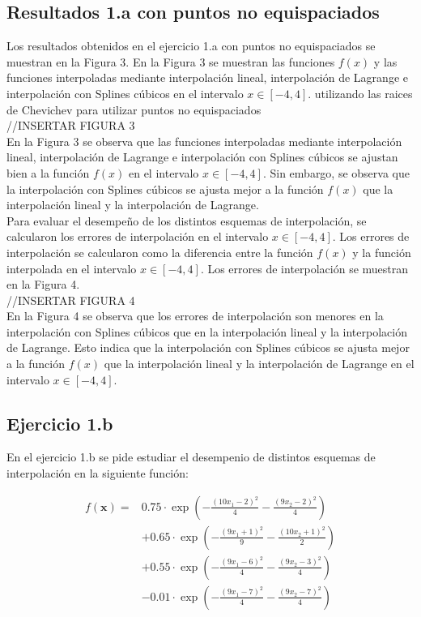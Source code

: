 \subsection{Resultados 1.a con puntos no equispaciados}
Los resultados obtenidos en el ejercicio 1.a con puntos no equispaciados se muestran en la Figura 3. En la Figura 3 se muestran las funciones $f(x)$ y las funciones interpoladas mediante interpolación lineal, interpolación de Lagrange e interpolación con Splines cúbicos en el intervalo $x \in [-4, 4]$. utilizando las raices de Chevichev para utilizar puntos no equispaciados\\
//INSERTAR FIGURA 3\\
En la Figura 3 se observa que las funciones interpoladas mediante interpolación lineal, interpolación de Lagrange e interpolación con Splines cúbicos se ajustan bien a la función $f(x)$ en el intervalo $x \in [-4, 4]$. Sin embargo, se observa que la interpolación con Splines cúbicos se ajusta mejor a la función $f(x)$ que la interpolación lineal y la interpolación de Lagrange.\\
Para evaluar el desempeño de los distintos esquemas de interpolación, se calcularon los errores de interpolación en el intervalo $x \in [-4, 4]$. Los errores de interpolación se calcularon como la diferencia entre la función $f(x)$ y la función interpolada en el intervalo $x \in [-4, 4]$. Los errores de interpolación se muestran en la Figura 4.\\
//INSERTAR FIGURA 4\\
En la Figura 4 se observa que los errores de interpolación son menores en la interpolación con Splines cúbicos que en la interpolación lineal y la interpolación de Lagrange. Esto indica que la interpolación con Splines cúbicos se ajusta mejor a la función $f(x)$ que la interpolación lineal y la interpolación de Lagrange en el intervalo $x \in [-4, 4]$.\\

\subsection{Ejercicio 1.b}
En el ejercicio 1.b se pide estudiar el desempenio de distintos esquemas de interpolación en la siguiente función:

\begin{equation}
    \begin{aligned}
    f(\textbf{x}) =&0.75 \cdot \exp\left(-\frac{(10x_1 - 2)^2}{4} - \frac{(9x_2 - 2)^2}{4}\right) \\
    & + 0.65 \cdot \exp\left(-\frac{(9x_1 + 1)^2}{9} - \frac{(10x_2 + 1)^2}{2}\right) \\
    & + 0.55 \cdot \exp\left(-\frac{(9x_1 - 6)^2}{4} - \frac{(9x_2 - 3)^2}{4}\right) \\
    & - 0.01 \cdot \exp\left(-\frac{(9x_1 - 7)^2}{4} - \frac{(9x_2 - 7)^2}{4}\right)
    \end{aligned}
    \end{equation}

